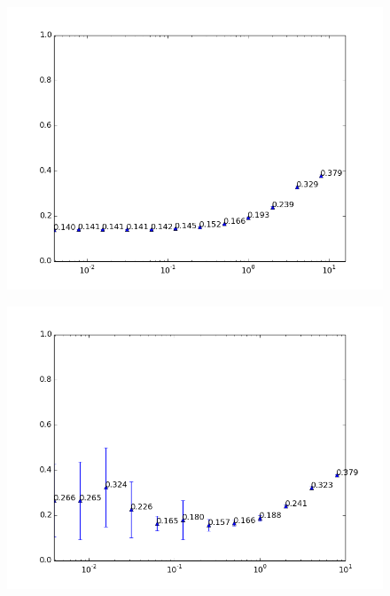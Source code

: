 \begin{figure}[h!]
	\centering
	\begin{minipage}{.49\linewidth}
		\includegraphics[width=\linewidth]{fig/spambase/eps2e10,budg=eps,peers10,groups10,reg2e-8-2e3-data368-pubAll-spam-baseline-testset}
		\label{fig:regularization_extremelyhighepsilon}
	\end{minipage}
	\hspace{.001\linewidth}
	\begin{minipage}{.49\linewidth}
		\includegraphics[width=\linewidth]{fig/spambase/eps0.1,budg=eps,peers10,groups10,reg2e-8-2e3-data368-pubAll-spam-baseline-testset}

\end{minipage}
\end{figure}
